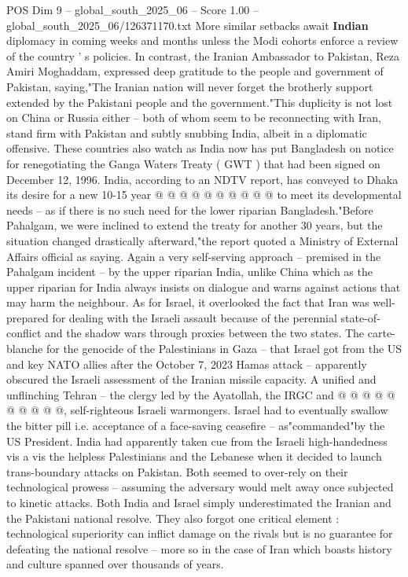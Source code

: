 \begin{textsample}{POS Dim 9 – global\_south\_2025\_06 – Score 1.00 – global\_south\_2025\_06/126371170.txt}
More similar setbacks await \textbf{Indian} diplomacy in coming weeks and months unless the Modi cohorts enforce a review of the country ' s policies.
In contrast, the Iranian Ambassador to Pakistan, Reza Amiri Moghaddam, expressed deep gratitude to the people and government of Pakistan, saying,"The Iranian nation will never forget the brotherly support extended by the Pakistani people and the government."This duplicity is not lost on China or Russia either -- both of whom seem to be reconnecting with Iran, stand firm with Pakistan and subtly snubbing India, albeit in a diplomatic offensive.
These countries also watch as India now has put Bangladesh on notice for renegotiating the Ganga Waters Treaty ( GWT ) that had been signed on December 12, 1996.
India, according to an NDTV report, has conveyed to Dhaka its desire for a new 10-15 year @ @ @ @ @ @ @ @ @ @ to meet its developmental needs -- as if there is no such need for the lower riparian Bangladesh."Before Pahalgam, we were inclined to extend the treaty for another 30 years, but the situation changed drastically afterward,"the report quoted a Ministry of External Affairs official as saying.
Again a very self-serving approach -- premised in the Pahalgam incident -- by the upper riparian India, unlike China which as the upper riparian for India always insists on dialogue and warns against actions that may harm the neighbour.
As for Israel, it overlooked the fact that Iran was well-prepared for dealing with the Israeli assault because of the perennial state-of-conflict and the shadow wars through proxies between the two states.
The carte-blanche for the genocide of the Palestinians in Gaza -- that Israel got from the US and key NATO allies after the October 7, 2023 Hamas attack -- apparently obscured the Israeli assessment of the Iranian missile capacity.
A unified and unflinching Tehran -- the clergy led by the Ayatollah, the IRGC and @ @ @ @ @ @ @ @ @ @, self-righteous Israeli warmongers.
Israel had to eventually swallow the bitter pill i.e. acceptance of a face-saving ceasefire -- as"commanded"by the US President.
India had apparently taken cue from the Israeli high-handedness vis a vis the helpless Palestinians and the Lebanese when it decided to launch trans-boundary attacks on Pakistan.
Both seemed to over-rely on their technological prowess -- assuming the adversary would melt away once subjected to kinetic attacks.
Both India and Israel simply underestimated the Iranian and the Pakistani national resolve.
They also forgot one critical element : technological superiority can inflict damage on the rivals but is no guarantee for defeating the national resolve -- more so in the case of Iran which boasts history and culture spanned over thousands of years.

\end{textsample}
